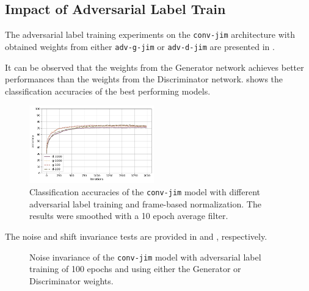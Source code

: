 \subsection{Impact of Adversarial Label Train}\label{sec:exp_adv_label}
The adversarial label training experiments on the \texttt{conv-jim} architecture with obtained weights from either \texttt{adv-g-jim} or \texttt{adv-d-jim} are presented in .

It can be observed that the weights from the Generator network achieves better performances than the weights from the Discriminator network.
 shows the classification accuracies of the best performing models.
\begin{figure}[!ht]
  \centering
  \includegraphics[width=0.48\textwidth]{./5_exp/figs/exp_adv_label_acc_conv-jim.png}
  \caption{Classification accuracies of the \texttt{conv-jim} model with different adversarial label training and frame-based normalization. The results were smoothed with a 10 epoch average filter.}
  \label{fig:exp_adv_label_acc_conv-jim}
\end{figure}
\FloatBarrier
\noindent
The noise and shift invariance tests are provided in  and , respectively.
\begin{figure}[!ht]
  \centering
  \qquad
  \caption{Noise invariance of the \texttt{conv-jim} model with adversarial label training of 100 epochs and using either the Generator or Discriminator weights.}
  \label{fig:exp_adv_label_tb_noise_conv-jim}
\end{figure}
